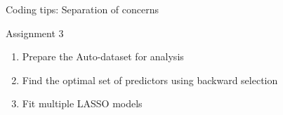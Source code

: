 \begin{frame}{Coding tips: Separation of concerns}
\end{frame}


\begin{frame}{Assignment 3}
    \begin{enumerate}
        \item Prepare the Auto-dataset for analysis
        \item Find the optimal set of predictors using backward selection
        \item Fit multiple LASSO models
    \end{enumerate}
\end{frame}
